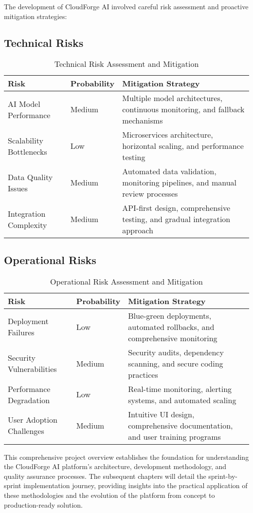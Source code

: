 The development of CloudForge AI involved careful risk assessment and proactive mitigation strategies:

\subsection{Technical Risks}

\begin{table}[H]
\centering
\caption{Technical Risk Assessment and Mitigation}
\begin{tabular}{|p{4cm}|p{3cm}|p{6cm}|}
\hline
\textbf{Risk} & \textbf{Probability} & \textbf{Mitigation Strategy} \\
\hline
AI Model Performance & Medium & Multiple model architectures, continuous monitoring, and fallback mechanisms \\
\hline
Scalability Bottlenecks & Low & Microservices architecture, horizontal scaling, and performance testing \\
\hline
Data Quality Issues & Medium & Automated data validation, monitoring pipelines, and manual review processes \\
\hline
Integration Complexity & Medium & API-first design, comprehensive testing, and gradual integration approach \\
\hline
\end{tabular}
\end{table}

\subsection{Operational Risks}

\begin{table}[H]
\centering
\caption{Operational Risk Assessment and Mitigation}
\begin{tabular}{|p{4cm}|p{3cm}|p{6cm}|}
\hline
\textbf{Risk} & \textbf{Probability} & \textbf{Mitigation Strategy} \\
\hline
Deployment Failures & Low & Blue-green deployments, automated rollbacks, and comprehensive monitoring \\
\hline
Security Vulnerabilities & Medium & Security audits, dependency scanning, and secure coding practices \\
\hline
Performance Degradation & Low & Real-time monitoring, alerting systems, and automated scaling \\
\hline
User Adoption Challenges & Medium & Intuitive UI design, comprehensive documentation, and user training programs \\
\hline
\end{tabular}
\end{table}

This comprehensive project overview establishes the foundation for understanding the CloudForge AI platform's architecture, development methodology, and quality assurance processes. The subsequent chapters will detail the sprint-by-sprint implementation journey, providing insights into the practical application of these methodologies and the evolution of the platform from concept to production-ready solution.